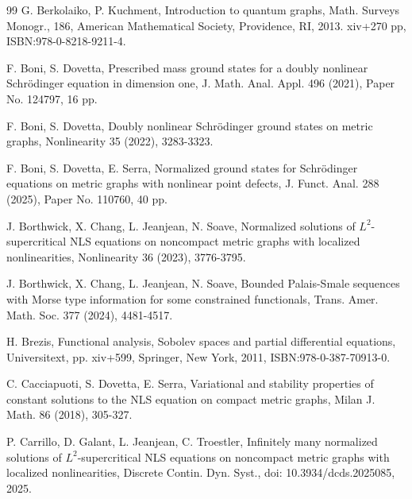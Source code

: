 \documentclass[11pt]{amsart}
\numberwithin{equation}{section}
\begin{document}
\begin{thebibliography}{99}
G. Berkolaiko, P. Kuchment, Introduction to quantum graphs, Math. Surveys Monogr., 186, American Mathematical Society, Providence, RI, 2013. xiv+270 pp, ISBN:978-0-8218-9211-4.


F. Boni, S. Dovetta, Prescribed mass ground states for a doubly nonlinear Schrödinger equation in dimension one, J. Math. Anal. Appl. 496 (2021),  Paper No. 124797, 16 pp.

F. Boni, S. Dovetta, Doubly nonlinear Schrödinger ground states on metric graphs, Nonlinearity 35 (2022),  3283-3323.

 F. Boni, S. Dovetta, E. Serra, Normalized ground states for Schr\"odinger equations on metric graphs with nonlinear point defects, J. Funct. Anal. 288 (2025), Paper No. 110760, 40 pp.

J. Borthwick, X. Chang, L. Jeanjean, N. Soave, Normalized solutions of $L^2$-supercritical NLS equations on noncompact metric graphs with localized nonlinearities, Nonlinearity 36 (2023), 3776-3795.

J. Borthwick, X. Chang, L. Jeanjean, N. Soave, Bounded Palais-Smale sequences with Morse type information for some constrained functionals, Trans. Amer. Math. Soc. 377 (2024), 4481-4517.

H. Brezis,
Functional analysis, Sobolev spaces and partial differential equations,
Universitext, pp. xiv+599, Springer, New York, 2011, ISBN:978-0-387-70913-0.



C. Cacciapuoti, S. Dovetta, E. Serra, Variational and stability properties of constant solutions to the NLS equation on compact metric graphs, Milan J. Math. 86 (2018), 305-327.

P. Carrillo, D. Galant, L. Jeanjean, C. Troestler, Infinitely many normalized solutions of $L^2$-supercritical NLS equations on noncompact metric graphs with localized nonlinearities, Discrete Contin. Dyn. Syst., doi: 10.3934/dcds.2025085, 2025.



\end{thebibliography}
\end{document}
